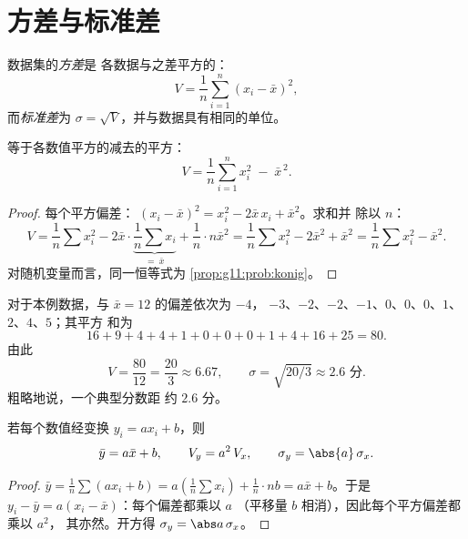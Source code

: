 \section{方差与标准差}

\begin{definition}[方差、标准差]\label{def:g11:stat:variance}
数据集的\emph{方差}是
各数据与之差平方的：
\[
V = \frac{1}{n}\sum_{i=1}^{n} (x_i - \bar x)^2,
\]
而\emph{标准差}为
$\sigma = \sqrt{V}$，并与数据具有相同的单位。
\end{definition}

\begin{proposition}[简便公式]\label{prop:g11:stat:shortcut}
等于各数值平方的减去的平方：
\[
V = \frac{1}{n}\sum_{i=1}^{n} x_i^2 \;-\; \bar x^{\,2}.
\]
\end{proposition}

\begin{proof}
每个平方偏差：
$(x_i - \bar x)^2 = x_i^2 - 2\bar x\, x_i + \bar x^2$。求和并
除以 $n$：
\[
V = \frac1n \sum x_i^2 - 2\bar x \cdot \underbrace{\frac1n \sum
x_i}_{=\ \bar x} + \frac1n \cdot n\bar x^2
= \frac1n\sum x_i^2 - 2\bar x^2 + \bar x^2
= \frac1n\sum x_i^2 - \bar x^2 .
\]
对随机变量而言，同一恒等式为
\cref{prop:g11:prob:konig}。
\end{proof}

\begin{example}\label{ex:g11:stat:variance}
对于本例数据，与 $\bar x = 12$ 的偏差依次为 $-4$，
$-3$、$-2$、$-2$、$-1$、$0$、$0$、$0$、$1$、$2$、$4$、$5$；其平方
和为
\[
16 + 9 + 4 + 4 + 1 + 0 + 0 + 0 + 1 + 4 + 16 + 25 = 80 .
\]
由此
\[
V = \frac{80}{12} = \frac{20}{3} \approx 6.67,
\qquad
\sigma = \sqrt{20/3} \approx 2.6 \text{ 分}.
\]
粗略地说，一个典型分数距
约 $2.6$ 分。
\end{example}

\begin{proposition}[单位变换]\label{prop:g11:stat:affine}
若每个数值经变换 $y_i = a x_i + b$，则
\[
\bar y = a \bar x + b,
\qquad
V_y = a^2\, V_x,
\qquad
\sigma_y = \abs{a}\,\sigma_x .
\]
\end{proposition}

\begin{proof}
$\bar y = \frac1n \sum (a x_i + b) = a\left(\frac1n\sum x_i\right) +
\frac1n \cdot nb = a\bar x + b$。于是
$y_i - \bar y = a(x_i - \bar x)$：每个偏差都乘以 $a$
（平移量 $b$ 相消），因此每个平方偏差都乘以 $a^2$，
其亦然。开方得
$\sigma_y = \abs a\,\sigma_x$。
\end{proof}

